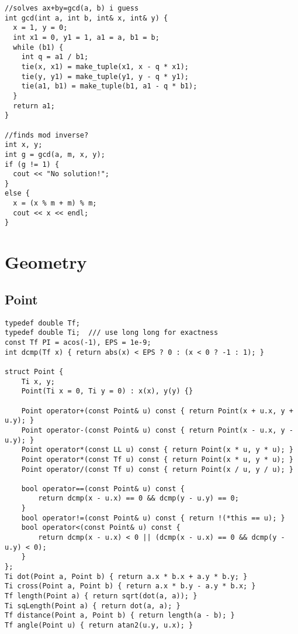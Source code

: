 \documentclass[FSZ,a4paper,onesided]{article}
\begin{document}
\begin{multicols*}{\COLS}
\begin{lstlisting}
//solves ax+by=gcd(a, b) i guess
int gcd(int a, int b, int& x, int& y) {
  x = 1, y = 0;
  int x1 = 0, y1 = 1, a1 = a, b1 = b;
  while (b1) {
    int q = a1 / b1;
    tie(x, x1) = make_tuple(x1, x - q * x1);
    tie(y, y1) = make_tuple(y1, y - q * y1);
    tie(a1, b1) = make_tuple(b1, a1 - q * b1);
  }
  return a1;
}

//finds mod inverse?
int x, y;
int g = gcd(a, m, x, y);
if (g != 1) {
  cout << "No solution!";
}
else {
  x = (x % m + m) % m;
  cout << x << endl;
}
\end{lstlisting}
\section{Geometry}
\subsection{Point}
\begin{lstlisting}
typedef double Tf;
typedef double Ti;  /// use long long for exactness
const Tf PI = acos(-1), EPS = 1e-9;
int dcmp(Tf x) { return abs(x) < EPS ? 0 : (x < 0 ? -1 : 1); }

struct Point {
    Ti x, y;
    Point(Ti x = 0, Ti y = 0) : x(x), y(y) {}

    Point operator+(const Point& u) const { return Point(x + u.x, y + u.y); }
    Point operator-(const Point& u) const { return Point(x - u.x, y - u.y); }
    Point operator*(const LL u) const { return Point(x * u, y * u); }
    Point operator*(const Tf u) const { return Point(x * u, y * u); }
    Point operator/(const Tf u) const { return Point(x / u, y / u); }

    bool operator==(const Point& u) const {
        return dcmp(x - u.x) == 0 && dcmp(y - u.y) == 0;
    }
    bool operator!=(const Point& u) const { return !(*this == u); }
    bool operator<(const Point& u) const {
        return dcmp(x - u.x) < 0 || (dcmp(x - u.x) == 0 && dcmp(y - u.y) < 0);
    }
};
Ti dot(Point a, Point b) { return a.x * b.x + a.y * b.y; }
Ti cross(Point a, Point b) { return a.x * b.y - a.y * b.x; }
Tf length(Point a) { return sqrt(dot(a, a)); }
Ti sqLength(Point a) { return dot(a, a); }
Tf distance(Point a, Point b) { return length(a - b); }
Tf angle(Point u) { return atan2(u.y, u.x); }


\end{lstlisting}
\end{multicols*}
\end{document}
